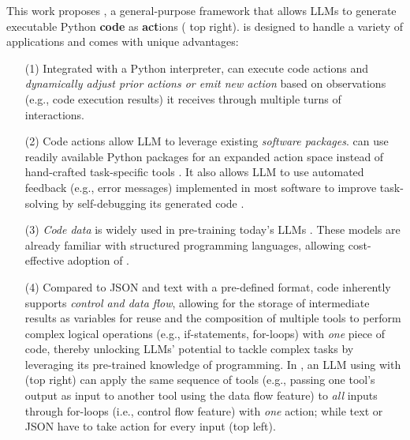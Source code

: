 This work proposes \approach, a general-purpose framework that allows LLMs to generate executable Python \textbf{code} as \textbf{act}ions ( top right).
% 
\approach is designed to handle a variety of applications and comes with unique advantages:
% 
\begin{itemize}[noitemsep,topsep=0pt,parsep=0pt,partopsep=0pt,leftmargin=18pt]
\item[(1) ]Integrated with a Python interpreter, \approach can execute code actions and \textit{dynamically adjust prior actions or emit new action} based on observations (e.g., code execution results) it receives through multiple turns of interactions.

\item[(2)]
Code actions allow LLM to leverage existing \textit{software packages}. \approach can use readily available Python packages for an expanded action space instead of hand-crafted task-specific tools \citep{Yuan2023CRAFTCL,shen2023hugginggpt}. It also allows LLM to use automated feedback (e.g., error messages) implemented in most software to improve task-solving by self-debugging its generated code \citep{chen2023teaching,Wang2023LeTI}.

\item[(3)] 
\textit{Code data} is widely used in pre-training today's  LLMs \citep{yang2024llm}.
These models are already familiar with structured programming languages, allowing cost-effective adoption of \approach.

\item[(4)]
Compared to JSON and text with a pre-defined format, code inherently supports \textit{control and data flow}, allowing for the storage of intermediate results as variables for reuse and the composition of multiple tools to perform complex logical operations (e.g., if-statements, for-loops) with \textit{one} piece of code, thereby unlocking LLMs' potential to tackle complex tasks by leveraging its pre-trained knowledge of programming.
% 
In , an LLM using with \approach (top right) can apply the same sequence of tools (e.g., passing one tool's output as input to another tool using the data flow feature) to \textit{all} inputs through for-loops (i.e., control flow feature) with \textit{one} action; while text or JSON have to take action for every input (top left).
\end{itemize}

